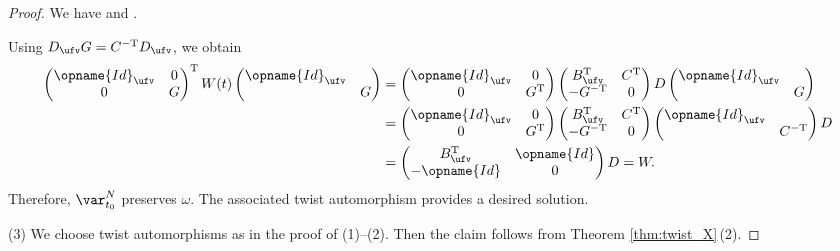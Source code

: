 \documentclass[pdftex]{sigma}
\newcommand{\Id}{{\opname{Id}}}
\numberwithin{equation}{section}
\begin{document}
\begin{proof}
We have \smash{$W=B^{\rm T}D=\left(\begin{smallmatrix}
B_{\ufv}^{\rm T} & \Id\\
-\Id & 0
\end{smallmatrix}\right)D$} and .

Using $D_{\ufv}G=C^{\rm -T}D_{\ufv}$, we obtain
\begin{align*}
\begin{pmatrix}
\Id_{\ufv} & 0\\
0 & G
\end{pmatrix}^{\rm T}W(t)\begin{pmatrix}
\Id_{\ufv}\\
 & G
\end{pmatrix} & =\begin{pmatrix}
\Id_{\ufv} & 0\\
0 & G^{\rm T}
\end{pmatrix}\begin{pmatrix}
B_{\ufv}^{\rm T} & C^{\rm T}\\
-G^{\rm -T} & 0
\end{pmatrix}D\begin{pmatrix}
\Id_{\ufv}\\
 & G
\end{pmatrix}\\
 & =\begin{pmatrix}
\Id_{\ufv} & 0\\
0 & G^{\rm T}
\end{pmatrix}\begin{pmatrix}
B_{\ufv}^{\rm T} & C^{\rm T}\\
-G^{\rm -T} & 0
\end{pmatrix}\begin{pmatrix}
\Id_{\ufv}\\
 & C^{\rm -T}
\end{pmatrix}D\\
 & =\begin{pmatrix}
B_{\ufv}^{\rm T} & \Id\\
-\Id & 0
\end{pmatrix}D =W.
\end{align*}
Therefore, $\var_{t_{0}}^{N}$ preserves $\omega$. The associated
twist automorphism provides a desired solution.

(3) We choose twist automorphisms as in the proof of (1)--(2). Then
the claim follows from Theorem \ref{thm:twist_X}\,(2).
\end{proof}
\end{document}
